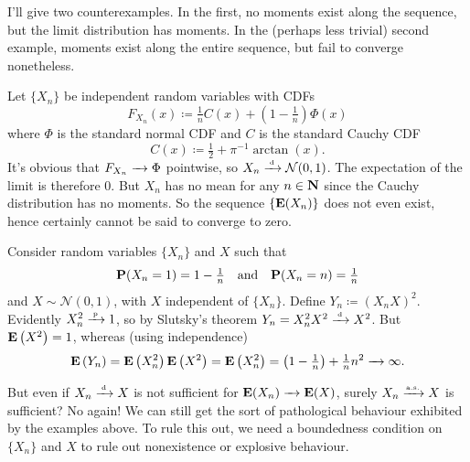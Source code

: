 \documentclass[11pt,letterpaper,reqno,oneside]{article}
\begin{document}
I'll give two counterexamples. In the first, no moments exist along the sequence, but the limit distribution has moments. In the (perhaps less trivial) second example, moments exist along the entire sequence, but fail to converge nonetheless.
%
\begin{example}
	Let $\{ X_n \}$ be independent random variables with CDFs
	\begin{equation*}
		F_{X_n}(x) \coloneqq \tfrac{1}{n} C(x) + \left(1-\tfrac{1}{n}\right) \Phi(x)
	\end{equation*}
	where $\Phi$ is the standard normal CDF and $C$ is the standard Cauchy CDF
	\begin{equation*}
		C(x) \coloneqq \tfrac{1}{2} + \pi^{-1} \arctan(x) .
	\end{equation*}
	It's obvious that $F_{X_n} \xrightarrow{\;\;\;} \Phi$ pointwise, so $X_n \xrightarrow{{\scriptscriptstyle \mathrm{\;d\;}}} \mathcal{N}(0,1)$. The expectation of the limit is therefore $0$. But $X_n$ has no mean for any $n \in \mathbf{N}$ since the Cauchy distribution has no moments. So the sequence $\{ \mathbf{E}(X_n) \}$ does not even exist, hence certainly cannot be said to converge to zero.
\end{example}
%
\begin{example}
	Consider random variables $\{ X_n \}$ and $X$ such that
	\begin{equation*}
		\mathbf{P}(X_n=1) = 1 - \tfrac{1}{n}
		\quad\text{and}\quad
		\mathbf{P}(X_n=n)=\tfrac{1}{n} 
	\end{equation*}
	and $X \sim \mathcal{N}(0,1)$, with $X$ independent of $\{ X_n \}$. Define $Y_n \coloneqq (X_n X)^2$. Evidently $X_n^2 \xrightarrow{{\scriptscriptstyle \mathrm{\;p\;}}} 1$, so by Slutsky's theorem $Y_n = X_n^2 X^2 \xrightarrow{{\scriptscriptstyle \mathrm{\;d\;}}} X^2$. But $\mathbf{E}\left( X^2 \right)=1$, whereas (using independence)
	\begin{equation*}
		\mathbf{E}\left( Y_n \right)
		= \mathbf{E}\left( X_n^2 \right) \mathbf{E}\left( X^2 \right)
		= \mathbf{E}\left( X_n^2 \right)
		= \left( 1 - \tfrac{1}{n} \right) + \tfrac{1}{n} n^2
		\xrightarrow{\;\;\;} \infty .
	\end{equation*}
\end{example}

But even if $X_n \xrightarrow{{\scriptscriptstyle \mathrm{\;d\;}}} X$ is not sufficient for $\mathbf{E}(X_n) \xrightarrow{\;\;\;} \mathbf{E}(X)$, surely $X_n \xrightarrow{{\scriptscriptstyle \mathrm{a.s.}}} X$ is sufficient? No again! We can still get the sort of pathological behaviour exhibited by the examples above. To rule this out, we need a boundedness condition on $\{ X_n \}$ and $X$ to rule out nonexistence or explosive behaviour.
\end{document}
